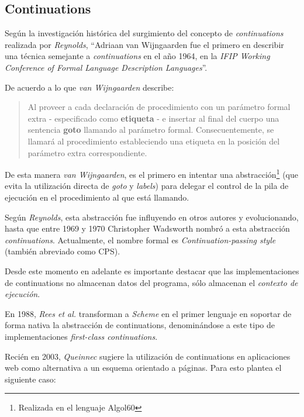 \subsection{Continuations}

Según la investigación histórica del surgimiento del concepto de \emph{continuations} realizada por \emph{Reynolds}, ``Adriaan van Wijngaarden fue el primero en describir una técnica semejante a \emph{continuations} en el año 1964, en la \emph{IFIP Working Conference of Formal Language Description Languages}''\cite[p.~234]{Reynolds93}.

De acuerdo a lo que \emph{van Wijngaarden} describe:

\begin{quote}
Al proveer a cada declaración de procedimiento con un parámetro formal extra - especificado como \textbf{etiqueta} - e insertar al final del cuerpo una sentencia \textbf{goto} llamando al parámetro formal. Consecuentemente, se llamará al proce\-dimiento estableciendo una etiqueta en la posición del parámetro extra correspondiente.\cite[p.~14]{vanWijngaarden66}
\end{quote}

De esta manera \emph{van Wijngaarden}, es el primero en intentar una abstracción\footnote{Realizada en el lenguaje Algol60} (que evita la utilización directa de \emph{goto} y \emph{labels}) para delegar el control de la pila de ejecución en el procedimiento al que está llamando.

Según \emph{Reynolds}, esta abstracción fue influyendo en otros autores y evolucionando, hasta que entre 1969 y 1970 Christopher Wadsworth nombró a esta abstracción \emph{continuations}. Actualmente, el nombre formal es \emph{Continuation-passing style} (también abreviado como CPS).

Desde este momento en adelante es importante destacar que las implementaciones de continuations no almacenan datos del programa, sólo almacenan el \emph{contexto de ejecución}.

En 1988, \emph{Rees et al.} transforman a \emph{Scheme} en el primer lenguaje en soportar de forma nativa la abstracción de continuations, denominándose a este tipo de implementaciones \emph{first-class continuations}\cite[p.~3]{Rees88}.

Recién en 2003, \emph{Queinnec} sugiere la utilización de continuations en aplicaciones web como alternativa a un esquema orientado a páginas\cite{Queinnec01}. Para esto plantea el siguiente caso:

